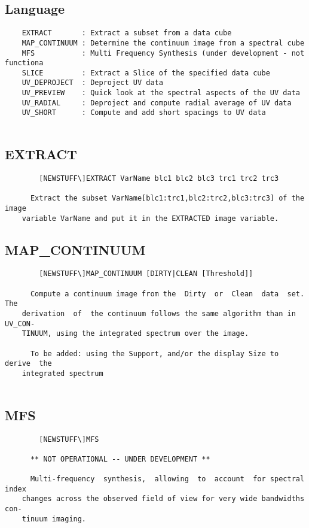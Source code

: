 \subsection{Language}
\begin{verbatim}
    EXTRACT       : Extract a subset from a data cube
    MAP_CONTINUUM : Determine the continuum image from a spectral cube
    MFS           : Multi Frequency Synthesis (under development - not functiona
    SLICE         : Extract a Slice of the specified data cube
    UV_DEPROJECT  : Deproject UV data
    UV_PREVIEW    : Quick look at the spectral aspects of the UV data
    UV_RADIAL     : Deproject and compute radial average of UV data
    UV_SHORT      : Compute and add short spacings to UV data


\end{verbatim}
\subsection{EXTRACT}
\begin{verbatim}
        [NEWSTUFF\]EXTRACT VarName blc1 blc2 blc3 trc1 trc2 trc3

      Extract the subset VarName[blc1:trc1,blc2:trc2,blc3:trc3] of the image
    variable VarName and put it in the EXTRACTED image variable.

\end{verbatim}
\subsection{MAP\_CONTINUUM}
\begin{verbatim}
        [NEWSTUFF\]MAP_CONTINUUM [DIRTY|CLEAN [Threshold]]

      Compute a continuum image from the  Dirty  or  Clean  data  set.   The
    derivation  of  the continuum follows the same algorithm than in UV_CON-
    TINUUM, using the integrated spectrum over the image.

      To be added: using the Support, and/or the display Size to derive  the
    integrated spectrum


\end{verbatim}
\subsection{MFS}
\begin{verbatim}
        [NEWSTUFF\]MFS

      ** NOT OPERATIONAL -- UNDER DEVELOPMENT **

      Multi-frequency  synthesis,  allowing  to  account  for spectral index
    changes across the observed field of view for very wide bandwidths  con-
    tinuum imaging.

\end{verbatim}
